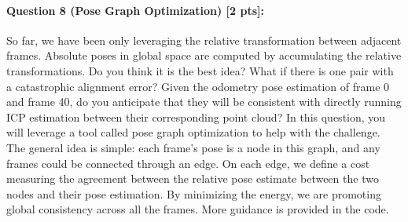 \documentclass[11pt]{article}
\begin{document}
\paragraph{Question 8 (Pose Graph Optimization) [2 pts]:}
So far, we have been only leveraging the relative transformation between adjacent frames. Absolute poses in global space are computed by accumulating the relative transformations. Do you think it is the best idea? What if there is one pair with a catastrophic alignment error? Given the odometry pose estimation of frame 0 and frame 40, %
do you anticipate that they will be consistent with directly running ICP estimation between their corresponding point cloud? In this question, you will leverage a tool called pose graph optimization to help with the challenge. The general idea is simple: each frame's pose is a node in this graph, and any frames could be connected through an edge. On each edge, we define a cost measuring the agreement between the relative pose estimate between the two nodes and their pose estimation. By minimizing the energy, we are promoting global consistency across all the frames. More guidance is provided in the code.
\end{document}

